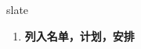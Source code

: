 
\begin{frame}
{\huge slate}
\begin{center}
\begin{enumerate}\Large
  \item \textbf{列入名单，计划，安排}
\end{enumerate}
\end{center}
\end{frame}
